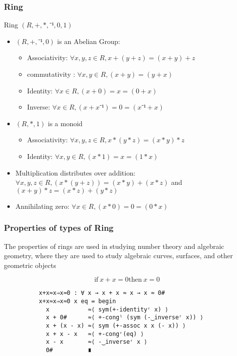 \documentclass[xcolor={dvipsnames}]{beamer}
\begin{document}
  \begin{frame}[fragile]
    \frametitle{Ring}  
    Ring $(R,+,*,⁻¹,0,1)$
        \begin{itemize}
            \item $(R,+,⁻¹,0)$ is an Abelian Group:
             \begin{itemize}
              \item Associativity: $\forall x,y,z \in R, x + (y + z) = (x + y) + z$
              \item commutativity : $\forall x,y \in R, (x + y) = (y + x)$
              \item Identity: $\forall x \in R, (x + 0) = x = (0 + x)$
              \item Inverse: $\forall x \in R, (x + x⁻¹) = 0 = (x⁻¹ + x)$
            \end{itemize}
            \item $(R,*,1)$ is a monoid
            \begin{itemize}
              \item Associativity: $\forall x,y,z \in R, x * (y * z) = (x * y) * z$
              \item Identity: $\forall x,y \in R, (x * 1) = x = (1 * x)$
            \end{itemize}
            \item Multiplication distributes over addition: \(\forall x , y , z \in R, (x * (y + z)) = (x * y) + (x
            * z)\) and \( (x + y) * z = (x * z) + (y * z) \)
            \item Annihilating zero: \(\forall x \in R, (x * 0) = 0 = (0 * x)\)
          \end{itemize}
  \end{frame}

  \begin{frame}[fragile]
    \frametitle{Properties of types of Ring}  
        The properties of rings are used in studying number theory and algebraic
        geometry, where they are used to study algebraic curves, surfaces, and
        other geometric objects

        \[\text{if}\ x + x =0 \text{then}\ x=0\]

        \begin{verbatim}
          x+x≈x⇒x≈0 : ∀ x → x + x ≈ x → x ≈ 0#
          x+x≈x⇒x≈0 x eq = begin
            x           ≈⟨ sym(+-identityʳ x) ⟩
            x + 0#      ≈⟨ +-congˡ (sym (-‿inverseʳ x)) ⟩
            x + (x - x) ≈⟨ sym (+-assoc x x (- x)) ⟩
            x + x - x   ≈⟨ +-congʳ(eq) ⟩
            x - x       ≈⟨ -‿inverseʳ x ⟩
            0#          ∎
          \end{verbatim}

  \end{frame}
\end{document}
